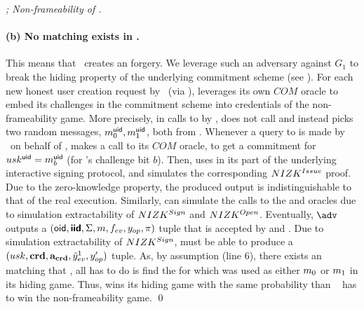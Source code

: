 \begin{proof}[; Non-frameability of \CUASGen]
  \paragraph{(b) No matching \Sig exists in \SIG.} %
  This means that \adv~creates an \UAS forgery. We leverage such an adversary
  against $G_1$ to break the hiding property of the underlying commitment
  scheme (see ). For each new honest user \uid creation
  request by \adv~(via \HUGEN),
  \advB leverages its own $COM$ oracle to embed its challenges in the commitment
  scheme into credentials of the \UAS non-frameability game. More precisely, in
  calls to \HUGEN by \adv, \advB does not call \UKeyGen and instead picks two
  random messages, $m_0^{\mathsf{uid}},m_1^{\mathsf{uid}}$, both from \AttrSpace. Whenever
  a query to \OBTAIN is made by \adv~on behalf of \uid, \advB makes a call to
  its $COM$ oracle, to get a commitment \Ccom for $usk^{\mathsf{uid}}=m_b^{\mathsf{uid}}$
  (for \advB's challenge bit $b$). Then,  \advB uses \Ccom in its \SBCMCom part
  of the underlying \SBCM interactive signing protocol, and simulates the
  corresponding $NIZK^{Issue}$ proof. Due to the zero-knowledge property, the
  produced output is indistinguishable to that of the real execution. Similarly,
  \advB can simulate the calls to the \SIGN and \OPEN oracles due to
  simulation extractability of $NIZK^{Sign}$ and $NIZK^{Open}$.
  Eventually, $\adv$ outputs a $(\mathsf{oid},\boldsymbol{\mathsf{\mathsf{iid}}},\Sigma,m,f_{ev},y_{op},\pi)$
  tuple that is accepted by \Verify and \Judge. Due to simulation extractability
  of $NIZK^{Sign}$, \ExtractSign must be able to produce a $(usk,\mathbf{crd},
  \mathbf{a}_{\mathbf{crd}}, \tilde{y}_{ev}^1,y_{op}')$ tuple. As, by assumption (line 6),  there
  exists an \uid matching that \usk, all \advB has to do is find the
  \uid for which \usk was used as either $m_0$ or $m_1$ in its hiding
  game. Thus, \advB wins its hiding game with the same probability than \adv~
  has to win the non-frameability game.
  \qed
\end{proof}


